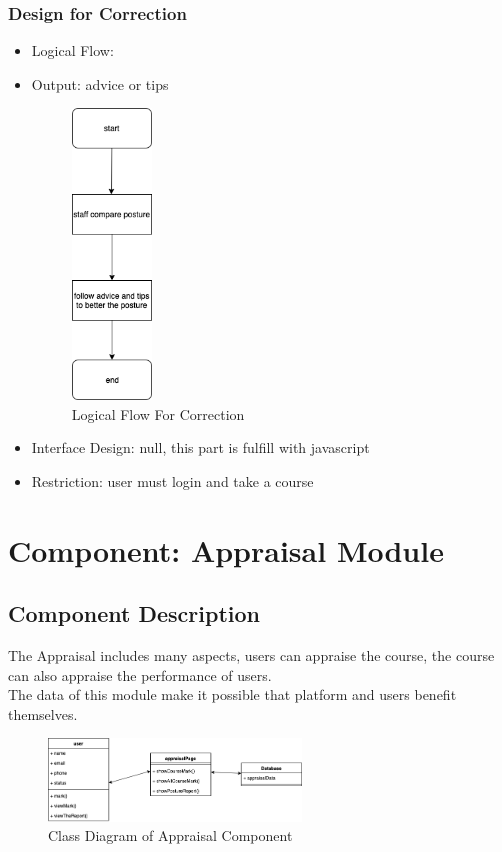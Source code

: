 \documentclass[16pt]{scrreprt}
\begin{document}
\subsubsection{Design for Correction}
\begin{itemize}
    \item Logical Flow:
    \item Output: advice or tips
        \begin{figure}[H]
            \centering
            \includegraphics[width=0.2\textwidth]{diagrams/flow-corrcetion.png}
            \caption{Logical Flow For Correction}
        \end{figure}
    \item Interface Design: null, this part is fulfill with javascript
    \item Restriction: user must login and take a course
\end{itemize}

\section{Component: Appraisal Module}
\subsection{Component Description}
The Appraisal includes many aspects, users can appraise the course, the course can also appraise the performance of users.\\
The data of this module make it possible that platform and users benefit themselves.

\begin{figure}[H]
	\centering
	\includegraphics[width=0.6\textwidth]{diagrams/class-appraisal.png}
	\caption{Class Diagram of Appraisal Component}
\end{figure}
\end{document}
